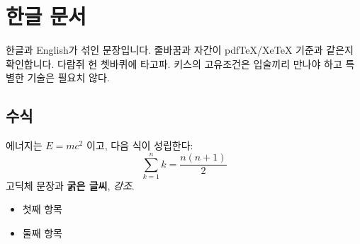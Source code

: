 \documentclass{article}
\begin{document}
\section{한글 문서}
한글과 English가 섞인 문장입니다. 줄바꿈과 자간이 pdfTeX/XeTeX 기준과 같은지 확인합니다. 다람쥐 헌 쳇바퀴에 타고파. 키스의 고유조건은 입술끼리 만나야 하고 특별한 기술은 필요치 않다.
\subsection{수식}
에너지는 $E = mc^2$ 이고, 다음 식이 성립한다:
\begin{equation} \sum_{k=1}^{n} k = \frac{n(n+1)}{2} \end{equation}
\textsf{고딕체 문장}과 \textbf{굵은 글씨}, \emph{강조}.
\begin{itemize}\item 첫째 항목 \item 둘째 항목\end{itemize}
\end{document}
